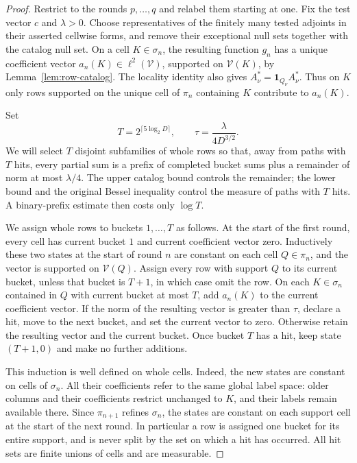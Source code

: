 \begin{proof}
Restrict to the rounds $p,\ldots,q$ and relabel them starting at one.
Fix the test vector $c$ and $\lambda>0$.  Choose representatives of
the finitely many tested adjoints in their asserted cellwise forms,
and remove their exceptional null sets together with the catalog null
set.  On a cell $K\in\sigma_n$, the resulting function $g_n$ has a
unique coefficient vector $a_n(K)\in\ell^2(\mathcal V)$, supported
on $\mathcal V(K)$, by Lemma~\ref{lem:row-catalog}.  The locality
identity also gives
$A_\nu^*=\mathbf1_{Q_\nu}A_\nu^*$.  Thus on $K$ only rows supported
on the unique cell of $\pi_n$ containing $K$ contribute to $a_n(K)$.

Set
\[
 T=2^{\lceil5\log_2D\rceil},\qquad
 \tau=\frac{\lambda}{4D^{3/2}}.
\]
We will select $T$ disjoint subfamilies of whole rows so that, away from
paths with $T$ hits, every partial sum is a prefix of completed bucket
sums plus a remainder of norm at most $\lambda/4$.  The upper catalog
bound controls the remainder; the lower bound and the original Bessel
inequality control the measure of paths with $T$ hits.  A binary-prefix
estimate then costs only $\log T$.

We assign whole rows to buckets $1,\ldots,T$ as follows.  At the
start of the first round, every cell has current bucket $1$ and
current coefficient vector zero.  Inductively these two states at
the start of round $n$ are constant on each cell $Q\in\pi_n$,
and the vector is supported on $\mathcal V(Q)$.
Assign every row with support $Q$ to its current bucket, unless
that bucket is $T+1$, in which case omit the row.  On each
$K\in\sigma_n$ contained in $Q$ with current bucket at most $T$,
add $a_n(K)$ to the current coefficient vector.  If the norm of the resulting vector is
greater than $\tau$, declare a hit, move to the next bucket, and
set the current vector to zero.  Otherwise retain the resulting
vector and the current bucket.  Once bucket $T$ has a hit, keep
state $(T+1,0)$ and make no further additions.

This induction is well defined on whole cells.  Indeed, the new
states are constant on cells of $\sigma_n$.  All their coefficients
refer to the same global label space: older columns and their
coefficients restrict unchanged to $K$, and their labels remain
available there.  Since $\pi_{n+1}$ refines $\sigma_n$, the states
are constant on each support cell at the start of the next round.
In particular a row is assigned one bucket for its entire support,
and is never split by the set on which a hit has occurred.  All
hit sets are finite unions of cells and are measurable.


\end{proof}
